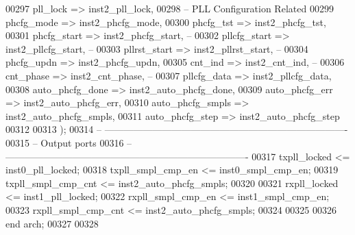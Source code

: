 \begin{DoxyCode}
00297       pll_lock          => inst2_pll_lock,
00298 \textcolor{keyword}{         -- PLL Configuration Related}
00299       phcfg_mode        => inst2_phcfg_mode,
00300       phcfg_tst         => inst2_phcfg_tst,
00301       phcfg_start       => inst2_phcfg_start,\textcolor{keyword}{   --}
00302       pllcfg_start      => inst2_pllcfg_start,\textcolor{keyword}{  --}
00303       pllrst_start      => inst2_pllrst_start,\textcolor{keyword}{  --}
00304       phcfg_updn        => inst2_phcfg_updn,
00305       cnt_ind           => inst2_cnt_ind,\textcolor{keyword}{       --}
00306       cnt_phase         => inst2_cnt_phase,\textcolor{keyword}{     --}
00307       pllcfg_data       => inst2_pllcfg_data,
00308       auto_phcfg_done   => inst2_auto_phcfg_done,
00309       auto_phcfg_err    => inst2_auto_phcfg_err,
00310       auto_phcfg_smpls  => inst2_auto_phcfg_smpls,
00311       auto_phcfg_step   => inst2_auto_phcfg_step
00312         
00313       \textcolor{vhdlchar}{)};
00314 \textcolor{keyword}{-- ----------------------------------------------------------------------------}
00315 \textcolor{keyword}{-- Output ports}
00316 \textcolor{keyword}{-- ----------------------------------------------------------------------------  }
00317 \textcolor{vhdlchar}{txpll_locked}         \textcolor{vhdlchar}{<=} \textcolor{vhdlchar}{inst0_pll_locked};
00318 \textcolor{vhdlchar}{txpll_smpl_cmp_en}    \textcolor{vhdlchar}{<=} \textcolor{vhdlchar}{inst0_smpl_cmp_en};
00319 \textcolor{vhdlchar}{txpll_smpl_cmp_cnt}   \textcolor{vhdlchar}{<=} \textcolor{vhdlchar}{inst2_auto_phcfg_smpls};
00320 
00321 \textcolor{vhdlchar}{rxpll_locked}         \textcolor{vhdlchar}{<=} \textcolor{vhdlchar}{inst1_pll_locked};
00322 \textcolor{vhdlchar}{rxpll_smpl_cmp_en}    \textcolor{vhdlchar}{<=} \textcolor{vhdlchar}{inst1_smpl_cmp_en};
00323 \textcolor{vhdlchar}{rxpll_smpl_cmp_cnt}   \textcolor{vhdlchar}{<=} \textcolor{vhdlchar}{inst2_auto_phcfg_smpls};
00324 
00325 
00326 \textcolor{keywordflow}{end} \textcolor{vhdlchar}{arch};   
00327 
00328 
\end{DoxyCode}
